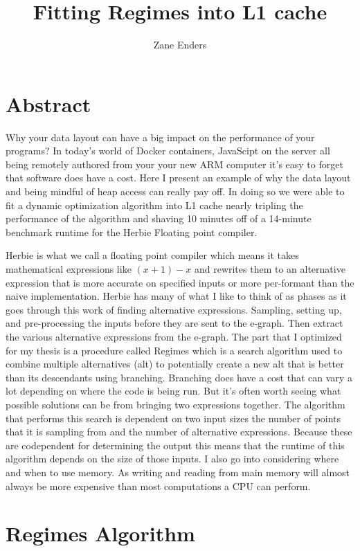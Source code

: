 \documentclass{article}
\title{Fitting Regimes into L1 cache}
\author{Zane Enders}
\begin{document}
\maketitle

\section{Abstract}

Why your data layout can have a big impact on the performance of your programs? In today's world of Docker containers, JavaScipt on the server all being remotely authored from your your new ARM computer it's easy to forget that software does have a cost. Here I present an example of why the data layout and being mindful of heap access can really pay off. In doing so we were able to fit a dynamic optimization algorithm into L1 cache nearly tripling the performance of the algorithm and shaving 10 minutes off of a 14-minute benchmark runtime for the Herbie Floating point compiler.

Herbie is what we call a floating point compiler which means it takes mathematical expressions like $(x + 1) - x$ and rewrites them to an alternative expression that is more accurate on specified inputs or more per-formant than the naive implementation. Herbie has many of what I like to think of as phases as it goes through this work of finding alternative expressions. Sampling, setting up, and pre-processing the inputs before they are sent to the e-graph. Then extract the various alternative expressions from the e-graph. The part that I optimized for my thesis is a procedure called Regimes which is a search algorithm used to combine multiple alternatives (alt) to potentially create a new alt that is better than its descendants using branching. Branching does have a cost that can vary a lot depending on where the code is being run. But it’s often worth seeing what possible solutions can be from bringing two expressions together. The algorithm that performs this search is dependent on two input sizes the number of points that it is sampling from and the number of alternative expressions. Because these are codependent for determining the output this means that the runtime of this algorithm depends on the size of those inputs. I also go into considering where and when to use memory. As writing and reading from main memory will almost always be more expensive than most computations a CPU can perform.
\section{Regimes Algorithm}
\end{document}

